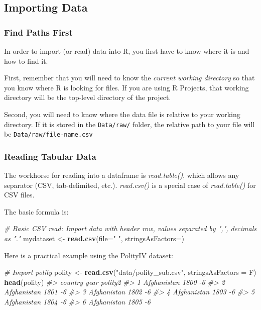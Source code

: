\documentclass[]{book}
\newenvironment{Shaded}{\begin{snugshade}}{\end{snugshade}}
\newcommand{\KeywordTok}[1]{\textcolor[rgb]{0.13,0.29,0.53}{\textbf{#1}}}
\newcommand{\DataTypeTok}[1]{\textcolor[rgb]{0.13,0.29,0.53}{#1}}
\newcommand{\StringTok}[1]{\textcolor[rgb]{0.31,0.60,0.02}{#1}}
\newcommand{\CommentTok}[1]{\textcolor[rgb]{0.56,0.35,0.01}{\textit{#1}}}
\newcommand{\NormalTok}[1]{#1}
\begin{document}
\subsection{Importing Data}\label{importing-data}

\subsubsection*{Find Paths First}\label{find-paths-first}

In order to import (or read) data into R, you first have to know where
it is and how to find it.

First, remember that you will need to know the \emph{current working
directory} so that you know where R is looking for files. If you are
using R Projects, that working directory will be the top-level directory
of the project.

Second, you will need to know where the data file is relative to your
working directory. If it is stored in the \texttt{Data/raw/} folder, the
relative path to your file will be \texttt{Data/raw/file-name.csv}

\subsubsection*{Reading Tabular Data}\label{reading-tabular-data}

The workhorse for reading into a dataframe is \emph{read.table()}, which
allows any separator (CSV, tab-delimited, etc.). \emph{read.csv()} is a
special case of \emph{read.table()} for CSV files.

The basic formula is:

\begin{Shaded}
\begin{Highlighting}[]
\CommentTok{# Basic CSV read: Import data with header row, values separated by ",", decimals as "."}
\NormalTok{mydataset <-}\StringTok{ }\KeywordTok{read.csv}\NormalTok{(}\DataTypeTok{file=}\StringTok{"  "}\NormalTok{, }\DataTypeTok{stringsAsFactors=}\NormalTok{)}
\end{Highlighting}
\end{Shaded}

Here is a practical example using the PolityIV dataset:

\begin{Shaded}
\begin{Highlighting}[]
\CommentTok{# Import polity}
\NormalTok{polity <-}\StringTok{ }\KeywordTok{read.csv}\NormalTok{(}\StringTok{"data/polity_sub.csv"}\NormalTok{, }\DataTypeTok{stringsAsFactors =}\NormalTok{ F)}
\KeywordTok{head}\NormalTok{(polity)}
\CommentTok{#>       country year polity2}
\CommentTok{#> 1 Afghanistan 1800      -6}
\CommentTok{#> 2 Afghanistan 1801      -6}
\CommentTok{#> 3 Afghanistan 1802      -6}
\CommentTok{#> 4 Afghanistan 1803      -6}
\CommentTok{#> 5 Afghanistan 1804      -6}
\CommentTok{#> 6 Afghanistan 1805      -6}
\end{Highlighting}
\end{Shaded}
\end{document}
